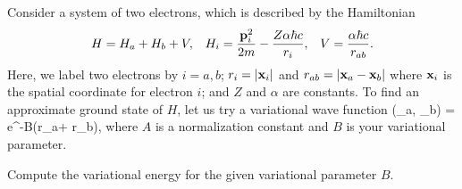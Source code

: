 \newcommand{\Ha}{H_a}
\newcommand{\Hb}{H_b}
\newcommand{\Hi}{H_i}
\newcommand{\vp}{\vb{p}}
\newcommand{\vpi}{\vp_i}
\newcommand{\alp}{\alpha}
\newcommand{\ri}{r_i}
\newcommand{\ra}{r_a}
\newcommand{\rb}{r_b}
\newcommand{\rab}{r_{a b}}
\newcommand{\vx}{\vb{x}}
\newcommand{\vxi}{\vx_i}
\newcommand{\vxa}{\vx_a}
\newcommand{\vxb}{\vx_b}

\begin{statement}{}
	Consider a system of two electrons, which is described by the Hamiltonian
	\begin{align*}
		H &= \Ha + \Hb + V, &
		\Hi &= \frac{\vpi^2}{2m} - \frac{Z \alp \hbar c}{\ri}, &
		V = \frac{\alp \hbar c}{\rab}.
	\end{align*}
	Here, we label two electrons by $i = a, b$; $\ri = \abs{\vxi}$ and $\rab = \abs{\vxa - \vxb}$ where $\vxi$ is the spatial coordinate for electron $i$; and $Z$ and $\alp$ are constants.  To find an approximate ground state of $H$, let us try a variational wave function
	\beq
		\Psi(\vxa, \vxb) =  e^{-B(\ra + \rb)},
	\eeq
	where $A$ is a normalization constant and $B$ is your variational parameter.
\end{statement}


\newcommand{\Hbar}{\bar{H}}
\newcommand{\ot}{\tilde{0}}
\newcommand{\kot}{\ket{\ot}}
\newcommand{\vpa}{\vp_a}
\newcommand{\vpb}{\vp_b}
\newcommand{\vr}{\vb{r}}
\newcommand{\vra}{\vec{r}_a}
\newcommand{\vrb}{\vec{r}_b}
\newcommand{\dcxa}{\dd[3]{\vxa}}
\newcommand{\dcxb}{\dd[3]{\vxb}}
\newcommand{\dcxap}{\dd[3]{\vxa'}}
\newcommand{\dcxbp}{\dd[3]{\vxb'}}
\newcommand{\dra}{\dd{\ra}}
\newcommand{\drb}{\dd{\rb}}
\newcommand{\drap}{\dd{\ra'}}
\newcommand{\drbp}{\dd{\rb'}}
\newcommand{\dr}{\dd{r}}
\newcommand{\tht}{\theta}
\newcommand{\tha}{\tht_a}
\newcommand{\dcta}{\dd{(\cos\tha)}}
\newcommand{\intono}{\int_{-1}^1}
\newcommand{\intab}{\int_{(\ra - \rb)^2}^{(\ra + \rb)^2}}

\begin{problem}
	Compute the variational energy for the given variational parameter $B$.
\end{problem}


